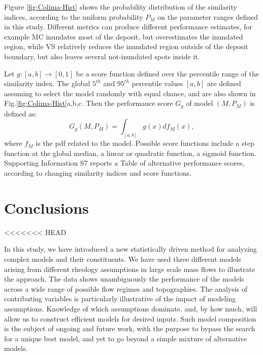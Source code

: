 \documentclass{article}
\begin{document}
Figure \ref{fig:Colima-Hist} shows the probability distribution of the similarity indices, according to the uniform probability $P_M$ on the parameter ranges defined in this study. Different metrics can produce different performance estimates, for example MC inundates most of the deposit, but overestimates the inundated region, while VS relatively reduces the inundated region outside of the deposit boundary, but also leaves several not-inundated spots inside it.

Let $g:[a,b]\rightarrow[0,1]$ be a score function defined over the percentile range of the similarity index. The global $5^{th}$ and $95^{th}$ percentile values $[a,b]$ are defined assuming to select the model randomly with equal chance, and are also shown in Fig.\ref{fig:Colima-Hist}a,b,c. Then the performance score $G_g$ of model $\left(M, P_M\right)$ is defined as:
$$G_g\left(M, P_M\right)=\int_{[a,b]} g(x) df_M(x),$$
where $f_M$ is the pdf related to the model. Possible score functions include a step function at the global median, a linear or quadratic function, a sigmoid function. Supporting Information S7 reports a Table of alternative performance scores, according to changing similarity indices and score functions.

\section{Conclusions}
<<<<<<< HEAD

In this study, we have introduced a new statistically driven method for analyzing complex models and their constituents. We have used three different models arising from different rheology assumptions in large scale mass flows to illustrate the approach. The data shows unambiguously the performance of the models across a wide range of possible flow regimes and topographies. The analysis of contributing variables is particularly illustrative of the impact of modeling assumptions. Knowledge of which assumptions dominate, and, by how much, will allow us to construct efficient models for desired inputs. Such model composition is the subject of ongoing and future work, with the purpose to bypass the search for a unique best model, and yet to go beyond a simple mixture of alternative models.
\end{document}
